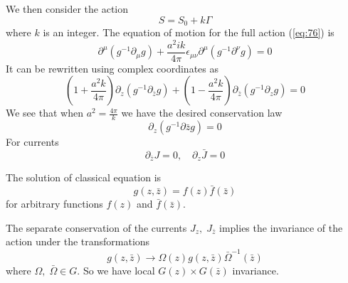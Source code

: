 \documentclass[a4paper,12pt]{article}
\theoremstyle{definition} \newtheorem{Def}{Definition}
\begin{document}
We then consider the action
\begin{equation}
  \label{eq:76}
  S=S_0+k\Gamma
\end{equation}
where $k$ is an integer. 
The equation of motion for the full action (\ref{eq:76}) is
\begin{equation}
  \label{eq:77}
  \partial^{\mu}(g^{-1}\partial_{\mu}g)+\frac{a^2 ik}{4\pi}\epsilon_{\mu\nu}\partial^{\mu}(g^{-1}\partial^{\nu}g)=0
\end{equation}
It can be rewritten using complex coordinates as
\begin{equation}
  \label{eq:78}
  (1+\frac{a^2 k}{4\pi})\partial_z(g^{-1}\partial_{\bar z}g)+(1-\frac{a^2 k}{4\pi})\partial_{\bar z}(g^{-1}\partial_z g)=0
\end{equation}
We see that when $a^2=\frac{4\pi}{k}$ we have the desired conservation law
\begin{equation}
  \label{eq:79}
  \partial_z(g^{-1}\partial{\bar z}g)=0
\end{equation}
For currents
\begin{equation}
  \label{eq:4}
  \partial_{\bar z}J=0,\quad \partial_z \bar J=0
\end{equation}

The solution of classical equation is
\begin{equation}
  \label{eq:80}
  g(z,\bar z)=f(z)\bar f(\bar z)
\end{equation}
for arbitrary functions $f(z)$ and $\bar f (\bar z)$.

The separate conservation of the currents $J_z,\; J_{\bar z}$ implies the invariance of the action under the transformations
\begin{equation}
  \label{eq:81}
   g(z,\bar z)\to \Omega(z)g(z,\bar z)\bar \Omega^{-1}(\bar z)
\end{equation}
where $\Omega,\;\bar \Omega \in G$. So we have local $G(z)\times G(\bar z)$ invariance. 
\end{document}
